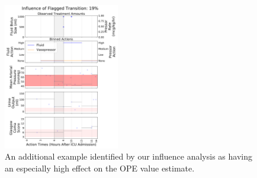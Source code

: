 \documentclass{article}
\begin{document}
\begin{figure}[H]
\centering
\includegraphics[width=0.45\textwidth]{ID-254228_trans-1.pdf}
\caption{An additional example identified by our influence analysis as having an especially high effect on the OPE value estimate.} 
\label{fig:mimic-1}
\end{figure}

\newpage


\end{document}
